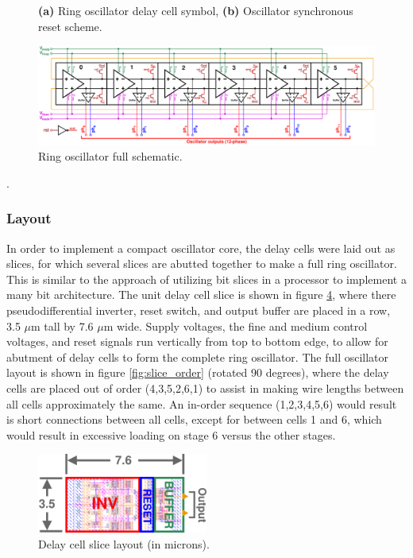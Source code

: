 \begin{figure}[htb!]
\begin{subfigure}{0.5\textwidth}
	        \caption{ }
	        \label{fig:dco_reset}
	    \end{subfigure}
	    \label{fig:vco_symbol_reset}
	    \caption{\textbf{(a)} Ring oscillator delay cell symbol, \textbf{(b)} Oscillator synchronous reset scheme.}
	\end{figure} 


	\begin{figure}
		\center%
		\includegraphics[width=1.5\textwidth, angle=90]{./figs/design/rosc_full_6stg2}
	    \caption{Ring oscillator full schematic.}
	    \label{fig:full_6sg_ro}
	\end{figure}



	{\color{white}.}
		\FloatBarrier\pagebreak
		\subsubsection{Layout}
		In order to implement a compact oscillator core, the delay cells were laid out as slices, for which several slices are abutted together to make a full ring oscillator. This is similar to the approach of utilizing bit slices in a processor to implement a many bit architecture. The unit delay cell slice is shown in figure \ref{fig:ro_slice}, where there pseudodifferential inverter, reset switch, and output buffer are placed in a row, 3.5 $\mu$m tall by 7.6 $\mu$m wide. Supply voltages, the fine and medium control voltages, and reset signals run vertically from top to bottom edge, to allow for abutment of delay cells to form the complete ring oscillator. The full oscillator layout is shown in figure \ref{fig:slice_order} (rotated 90 degrees), where the delay cells are placed out of order (4,3,5,2,6,1) to assist in making wire lengths between all cells approximately the same. An in-order sequence (1,2,3,4,5,6) would result is short connections between all cells, except for between cells 1 and 6, which would result in excessive loading on stage 6 versus the other stages.

			\begin{figure}[htb!]
			        \centering
			        \includegraphics[width=0.5\textwidth, angle=00]{./figs/design/ro_slice}
			    \caption{Delay cell slice layout (in microns).}
			    \label{fig:ro_slice}
			\end{figure}


